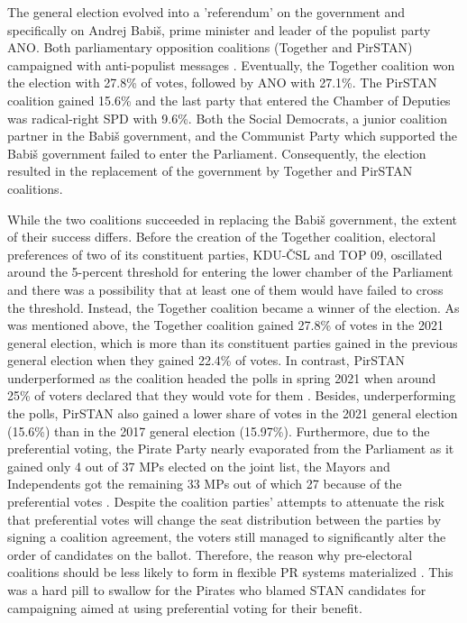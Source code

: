 \documentclass[]{interact}
\theoremstyle{plain}%
\theoremstyle{definition}
\theoremstyle{remark}
\begin{document}
The general election evolved into a 'referendum' on the government and specifically on Andrej Babiš, prime minister and leader of the populist party ANO. Both parliamentary opposition coalitions (Together and PirSTAN) campaigned with anti-populist messages \citep[c.f.][]{havlik2022,havlik2022b}. Eventually, the Together coalition won the election with 27.8\% of votes, followed by ANO with 27.1\%. The PirSTAN coalition gained 15.6\% and the last party that entered the Chamber of Deputies was radical-right SPD with 9.6\%. Both the Social Democrats, a junior coalition partner in the Babiš government, and the Communist Party which supported the Babiš government failed to enter the Parliament. Consequently, the election resulted in the replacement of the government by Together and PirSTAN coalitions.

While the two coalitions succeeded in replacing the Babiš government, the extent of their success differs. Before the creation of the Together coalition, electoral preferences of two of its constituent parties, KDU-ČSL and TOP 09, oscillated around the 5-percent threshold for entering the lower chamber of the Parliament and there was a possibility that at least one of them would have failed to cross the threshold. Instead, the Together coalition became a winner of the election. As was mentioned above, the Together coalition gained 27.8\% of votes in the 2021 general election, which is more than its constituent parties gained in the previous general election when they gained 22.4\% of votes. 
In contrast, PirSTAN underperformed as the coalition headed the polls in spring 2021 when around 25\% of voters declared that they would vote for them \citep[see e.g.][]{linek2022}. Besides, underperforming the polls, PirSTAN also gained a lower share of votes in the 2021 general election (15.6\%) than in the 2017 general election (15.97\%).
Furthermore, due to the preferential voting, the Pirate Party nearly evaporated from the Parliament as it gained only 4 out of 37 MPs elected on the joint list, the Mayors and Independents got the remaining 33 MPs out of which 27 because of the preferential votes \citep[15]{maskarinec2022}. Despite the coalition parties' attempts to attenuate the risk that preferential votes will change the seat distribution between the parties by signing a coalition agreement, the voters still managed to significantly alter the order of candidates on the ballot. Therefore, the reason why pre-electoral coalitions should be less likely to form in flexible PR systems materialized \citep{ibenskas2016}. This was a hard pill to swallow for the Pirates who blamed STAN candidates for campaigning aimed at using preferential voting for their benefit. 
\end{document}
